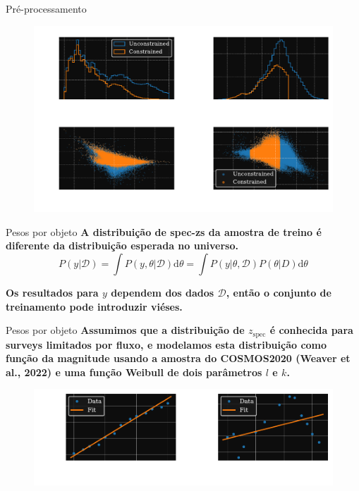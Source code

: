 \begin{frame}[c]{Pré-processamento}
    \begin{figure}
        \centering
        \includegraphics[height=7cm]{script/images/constraints_effect.pdf}
    \end{figure}
\end{frame}

\begin{frame}[c]{Pesos por objeto}
    \textbf{A distribuição de spec-zs da amostra de treino é diferente da distribuição esperada no universo.}
    \begin{equation*}
        P(y|\mathcal{D}) = \int P(y,\theta|\mathcal{D}) \text{d}\theta = \int P(y|\theta, \mathcal{D}) P(\theta|D) \text{d}\theta
    \end{equation*}
    \begin{splusbox}{}
        \textbf{Os resultados para $y$ dependem dos dados $\mathcal{D}$, então o conjunto de treinamento pode introduzir viéses.}
    \end{splusbox}
\end{frame}

\begin{frame}[c]{Pesos por objeto}
    \textbf{Assumimos que a distribuição de $z_\text{spec}$ é conhecida para surveys limitados por fluxo, e modelamos esta distribuição como função da magnitude usando a amostra do COSMOS2020 (Weaver et al., 2022) e uma função Weibull de dois parâmetros $l$ e $k$.}

    \begin{figure}
        \centering
        \includegraphics[width=\linewidth]{script/images/laerte_fit.pdf}
    \end{figure}
\end{frame}

